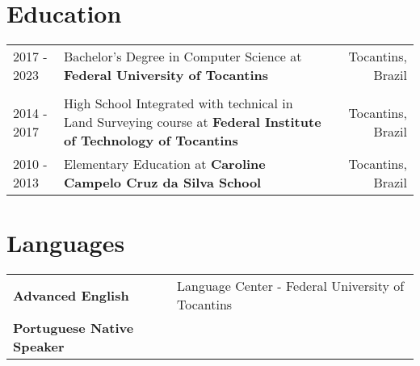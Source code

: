\documentclass[a4paper,12pt]{article}
\begin{document}
\section{Education}
\begin{tabularx}{\linewidth}{lXr}	
2017 - 2023 & Bachelor's Degree in Computer Science at \textbf{Federal University of Tocantins} & \hfill Tocantins, Brazil \\\\

2014 - 2017 & High School Integrated with technical in Land Surveying course at \textbf{Federal Institute of Technology of Tocantins} & \hfill Tocantins, Brazil \\ 

2010 - 2013 & Elementary Education at \textbf{Caroline Campelo Cruz da Silva School} & \hfill Tocantins, Brazil \\ 
\end{tabularx}


\section{Languages}
\begin{tabularx}{\linewidth}{@{}l X@{}}
\textbf{Advanced English} & \hfill Language Center - Federal University of Tocantins \\
\textbf{Portuguese Native Speaker}
\end{tabularx}

\end{document}
